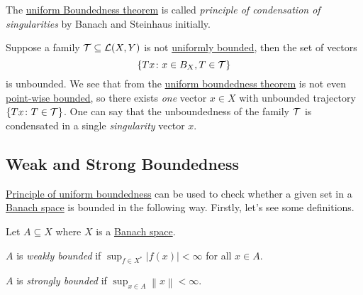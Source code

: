 \begin{remark}
	The \hyperref[thm:uniform-boundedness]{uniform Boundedness theorem} is called \emph{principle of condensation of singularities} by Banach and Steinhaus initially.
\end{remark}
\begin{explanation}
	Suppose a family \(\mathcal{\MakeUppercase{t}} \subseteq \mathcal{\MakeUppercase{l}} (X, Y)\) is not \hyperref[def:uniformly-bounded]{uniformly bounded}, then the set of vectors
	\[
		\left\{ Tx\colon x\in B_X, T\in \mathcal{\MakeUppercase{t}}  \right\}
	\]
	is unbounded. We see that from the \hyperref[thm:uniform-boundedness]{uniform boundedness theorem} is not even \hyperref[def:point-wise-bounded]{point-wise bounded}, so there exists \emph{one} vector \(x\in X\) with unbounded trajectory \(\left\{ Tx\colon T\in \mathcal{\MakeUppercase{t}}  \right\} \). One can say that the unboundedness of the family \(\mathcal{\MakeUppercase{t}} \) is condensated in a single \emph{singularity} vector \(x\).
\end{explanation}

\subsection{Weak and Strong Boundedness}
\hyperref[thm:uniform-boundedness]{Principle of uniform boundedness} can be used to check whether a given set in a \hyperref[def:Banach-space]{Banach space} is bounded in the following way. Firstly, let's see some definitions.

\begin{definition*}
	Let \(A \subseteq X\) where \(X\) is a \hyperref[def:Banach-space]{Banach space}.
	\begin{definition}\label{def:weakly-bounded}
		\(A\) is \emph{weakly bounded} if \(\sup _{f\in X^{\ast} }\left\vert f(x) \right\vert < \infty\) for all \(x\in A\).
	\end{definition}
	\begin{definition}\label{def:strongly-bounded}
		\(A\) is \emph{strongly bounded} if \(\sup _{x\in A}\left\lVert x\right\rVert < \infty\).
	\end{definition}
\end{definition*}

